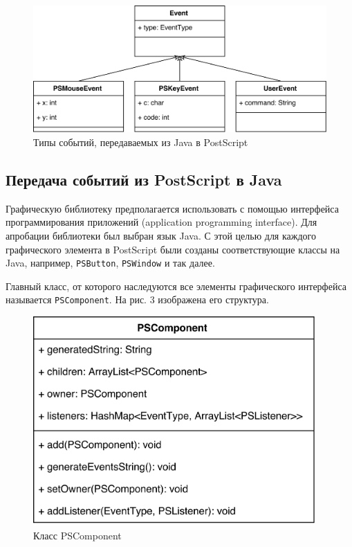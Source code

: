 \documentclass[14pt]{matmex-diploma}
\begin{document}
\begin{figure}[h!]
\label{разрыв_функции}
\centering
\includegraphics[width=15cm]{Events_from_Java.png}
\caption{Типы событий, передаваемых из Java в PostScript}
\end{figure}


\subsection{Передача событий из PostScript в Java}

Графическую библиотеку предполагается использовать с помощью интерфейса программирования приложений (application programming interface). Для апробации библиотеки был выбран язык Java. С этой целью для каждого графического элемента в PostScript были созданы соответствующие классы на Java, например, \texttt{PSButton}, \texttt{PSWindow} и так далее.

Главный класс, от которого наследуются все элементы графического интерфейса называется \texttt{PSComponent}. На рис. 3 изображена его структура.

\begin{figure}[h]
\label{разрыв_функции}
\centering
\includegraphics[height=8cm]{PSComponent_structure.png}
\caption{Класс PSComponent}
\end{figure}
\end{document}
